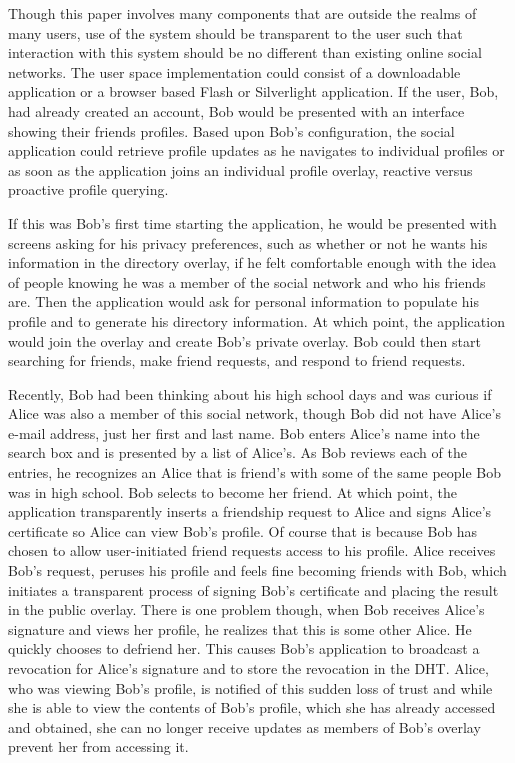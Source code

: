 \documentclass[conference]{IEEEtran}
\begin{document}
Though this paper involves many components that are outside the realms of many
users, use of the system should be transparent to the user such that
interaction with this system should be no different than existing online social
networks.  The user space implementation could consist of a downloadable
application or a browser based Flash or Silverlight application.  If the user,
Bob, had already created an account, Bob would be presented with an interface
showing their friends profiles.  Based upon Bob's configuration, the social
application could retrieve profile updates as he navigates to individual
profiles or as soon as the application joins an individual profile overlay,
reactive versus proactive profile querying.  

If this was Bob's first time starting the application, he would be presented
with screens asking for his privacy preferences, such as whether or not he
wants his information in the directory overlay, if he felt comfortable enough
with the idea of people knowing he was a member of the social network and who
his friends are.  Then the application would ask for personal information to
populate his profile and to generate his directory information.  At which
point, the application would join the overlay and create Bob's private overlay.
Bob could then start searching for friends, make friend requests, and respond
to friend requests.

Recently, Bob had been thinking about his high school days and was curious if
Alice was also a member of this social network, though Bob did not have Alice's
e-mail address, just her first and last name.  Bob enters Alice's name into the
search box and is presented by a list of Alice's.  As Bob reviews each of the
entries, he recognizes an Alice that is friend's with some of the same people
Bob was in high school.  Bob selects to become her friend.  At which point, the
application transparently inserts a friendship request to Alice and signs Alice's
certificate so Alice can view Bob's profile.  Of course that is because Bob has
chosen to allow user-initiated friend requests access to his profile.  Alice
receives Bob's request, peruses his profile and feels fine becoming friends with
Bob, which initiates a transparent process of signing Bob's certificate and
placing the result in the public overlay.  There is one problem though, when
Bob receives Alice's signature and views her profile, he realizes that this
is some other Alice.  He quickly chooses to defriend her.  This causes Bob's
application to broadcast a revocation for Alice's signature and to store the
revocation in the DHT.  Alice, who was viewing Bob's profile, is notified of
this sudden loss of trust and while she is able to view the contents of Bob's
profile, which she has already accessed and obtained, she can no longer
receive updates as members of Bob's overlay prevent her from accessing it.
\end{document}
